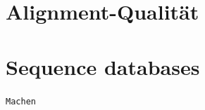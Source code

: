 \section{Alignment-Qualität}

\section{Sequence databases}



\begin{mechanism}[title=Coding Sequenz bioinformatisch analysieren - wie geht das?]
\texttt{Machen} %
\end{mechanism}



